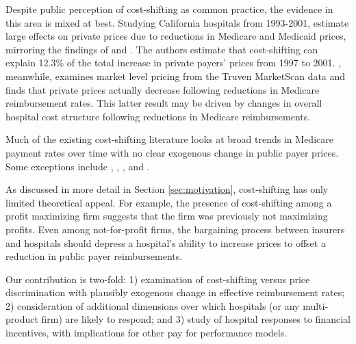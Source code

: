 \documentclass[12pt]{article}
\begin{document}
Despite public perception of cost-shifting as common practice, the evidence in this area is mixed at best. Studying California hospitals from 1993-2001, \cite{zwanziger2006} estimate large effects on private prices due to reductions in Medicare and Medicaid prices, mirroring the findings of \cite{lee2003} and \cite{zwanzinger2000}. The authors estimate that cost-shifting can explain 12.3\% of the total increase in private payers' prices from 1997 to 2001. \cite{white2013}, meanwhile, examines market level pricing from the Truven MarketScan data and finds that private prices actually decrease following reductions in Medicare reimbursement rates. This latter result may be driven by changes in overall hospital cost structure following reductions in Medicare reimbursements.

Much of the existing cost-shifting literature looks at broad trends in Medicare payment rates over time with no clear exogenous change in public payer prices. Some exceptions include \cite{dranove1988}, \cite{dranove1998}, \cite{wu2010}, and \cite{dranove2013}.

As discussed in more detail in Section \ref{sec:motivation}, cost-shifting has only limited theoretical appeal. For example, the presence of cost-shifting among a profit maximizing firm suggests that the firm was previously not maximizing profits. Even among not-for-profit firms, the bargaining process between insurers and hospitals should depress a hospital's ability to increase prices to offset a reduction in public payer reimbursements.

Our contribution is two-fold: 1) examination of cost-shifting versus price discrimination with plausibly exogenous change in effective reimbursement rates; 2) consideration of additional dimensions over which hospitals (or any multi-product firm) are likely to respond; and 3) study of hospital responses to financial incentives, with implications for other pay for performance models.

\pagebreak


\end{document}
